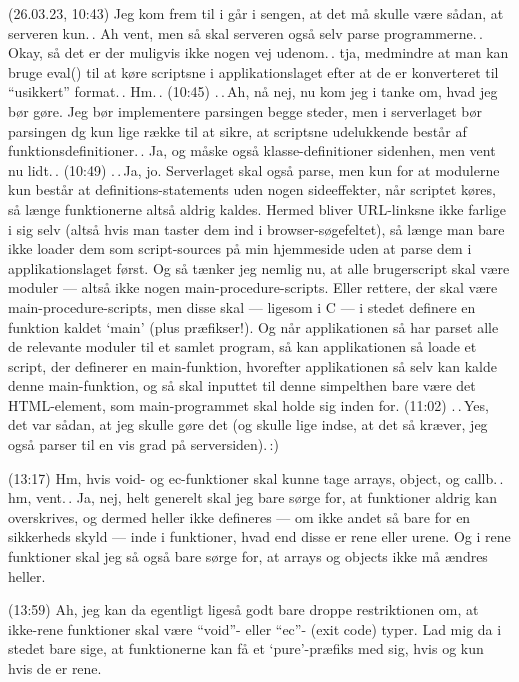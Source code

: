 \documentclass{report}
\begin{document}
(26.03.23, 10:43) Jeg kom frem til i går i sengen, at det må skulle være sådan, at serveren kun.\,. Ah vent, men så skal serveren også selv parse programmerne.\,. Okay, så det er der muligvis ikke nogen vej udenom.\,. tja, medmindre at man kan bruge eval() til at køre scriptsne i applikationslaget efter at de er konverteret til ``usikkert'' format.\,. Hm.\,. (10:45) .\,.\,Ah, nå nej, nu kom jeg i tanke om, hvad jeg bør gøre. Jeg bør implementere parsingen begge steder, men i serverlaget bør parsingen dg kun lige række til at sikre, at scriptsne udelukkende består af funktionsdefinitioner.\,. Ja, og måske også klasse-definitioner sidenhen, men vent nu lidt.\,. (10:49) .\,.\,Ja, jo. Serverlaget skal også parse, men kun for at modulerne kun består at definitions-statements uden nogen sideeffekter, når scriptet køres, så længe funktionerne altså aldrig kaldes. Hermed bliver URL-linksne ikke farlige i sig selv (altså hvis man taster dem ind i browser-søgefeltet), så længe man bare ikke loader dem som script-sources på min hjemmeside uden at parse dem i applikationslaget først. Og så tænker jeg nemlig nu, at alle brugerscript skal være moduler --- altså ikke nogen main-procedure-scripts. Eller rettere, der skal være main-procedure-scripts, men disse skal --- ligesom i C --- i stedet definere en funktion kaldet `main' (plus præfikser!). Og når applikationen så har parset alle de relevante moduler til et samlet program, så kan applikationen så loade et script, der definerer en main-funktion, hvorefter applikationen så selv kan kalde denne main-funktion, og så skal inputtet til denne simpelthen bare være det HTML-element, som main-programmet skal holde sig inden for. (11:02) .\,.\,Yes, det var sådan, at jeg skulle gøre det (og skulle lige indse, at det så kræver, jeg også parser til en vis grad på serversiden).\,:) 

(13:17) Hm, hvis void- og ec-funktioner skal kunne tage arrays, object, og callb.\,. hm, vent.\,. Ja, nej, helt generelt skal jeg bare sørge for, at funktioner aldrig kan overskrives, og dermed heller ikke defineres --- om ikke andet så bare for en sikkerheds skyld --- inde i funktioner, hvad end disse er rene eller urene. Og i rene funktioner skal jeg så også bare sørge for, at arrays og objects ikke må ændres heller.

(13:59) Ah, jeg kan da egentligt ligeså godt bare droppe restriktionen om, at ikke-rene funktioner skal være ``void''- eller ``ec''- (exit code) typer. Lad mig da i stedet bare sige, at funktionerne kan få et `pure'-præfiks med sig, hvis og kun hvis de er rene.
\end{document}
